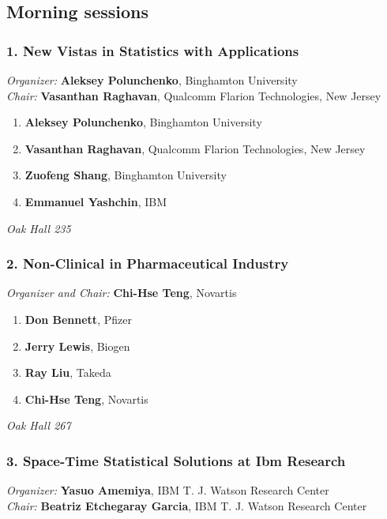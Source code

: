 
\subsection*{Morning sessions}

\subsubsection*{1. New Vistas in Statistics with Applications}

\emph{Organizer:} \textbf{Aleksey Polunchenko}, Binghamton University \\
\emph{Chair:} \textbf{Vasanthan Raghavan}, Qualcomm Flarion Technologies, New Jersey

\begin{enumerate}
\item \textbf{Aleksey Polunchenko}, Binghamton University 
\item \textbf{Vasanthan Raghavan}, Qualcomm Flarion Technologies, New Jersey 
\item \textbf{Zuofeng Shang}, Binghamton University 
\item \textbf{Emmanuel Yashchin}, IBM 
\end{enumerate}

\emph{Oak Hall 235} \\[.5em]

\subsubsection*{2. Non-Clinical in Pharmaceutical Industry}

\emph{Organizer and Chair:} \textbf{Chi-Hse Teng}, Novartis

\begin{enumerate}
\item \textbf{Don Bennett}, Pfizer 
\item \textbf{Jerry Lewis}, Biogen 
\item \textbf{Ray Liu}, Takeda 
\item \textbf{Chi-Hse Teng}, Novartis 
\end{enumerate}

\emph{Oak Hall 267} \\[.5em]

\subsubsection*{3. Space-Time Statistical Solutions at Ibm Research}

\emph{Organizer:} \textbf{Yasuo Amemiya}, IBM T. J. Watson Research Center \\
\emph{Chair:} \textbf{Beatriz Etchegaray Garcia}, IBM T. J. Watson Research Center

